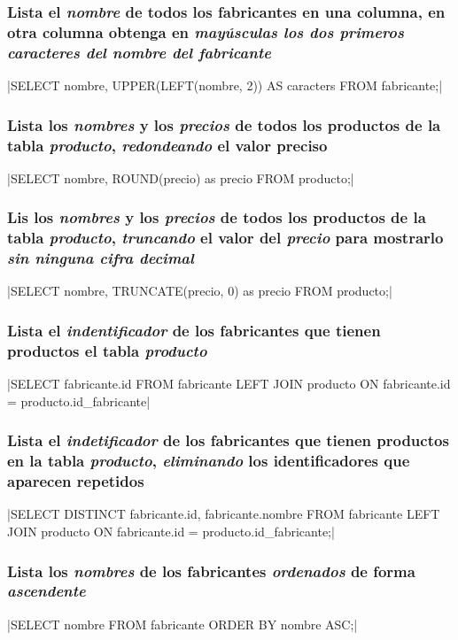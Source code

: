 \documentclass[12pt, letterpaper]{article}
\begin{document}
  \subsubsection{Lista el \textit{\textbf{nombre}} de todos los fabricantes en una columna, en otra columna obtenga en \textit{\textbf{mayúsculas los dos primeros caracteres del nombre del fabricante}}}
   |SELECT nombre, UPPER(LEFT(nombre, 2)) AS caracters FROM fabricante;|

  \subsubsection{Lista los \textit{\textbf{nombres}} y los \textit{\textbf{precios}} de todos los productos de la tabla \textit{\textbf{producto}}, \textit{\textbf{redondeando}} el valor preciso}
   |SELECT nombre, ROUND(precio) as precio FROM producto;|

  \subsubsection{Lis los \textit{\textbf{nombres}} y los \textit{\textbf{precios}} de todos los productos de la tabla \textit{\textbf{producto}}, \textit{\textbf{truncando}} el valor del \textit{\textbf{precio}} para mostrarlo \textit{\textbf{sin ninguna cifra decimal}}}
   |SELECT nombre, TRUNCATE(precio, 0) as precio FROM producto;|

  \subsubsection{Lista el \textit{\textbf{indentificador}} de los fabricantes que tienen productos el tabla \textit{\textbf{producto}}}
   |SELECT fabricante.id FROM fabricante LEFT JOIN producto ON fabricante.id = producto.id_fabricante|
  
  \subsubsection{Lista el \textit{\textbf{indetificador}} de los fabricantes que tienen productos en la tabla \textit{\textbf{producto}}, \textit{\textbf{eliminando}} los identificadores que aparecen repetidos}
   |SELECT DISTINCT fabricante.id, fabricante.nombre FROM fabricante LEFT JOIN producto ON fabricante.id = producto.id_fabricante;|

  \subsubsection{Lista los \textit{\textbf{nombres}} de los fabricantes \textit{\textbf{ordenados}} de forma \textit{\textbf{ascendente}}}
   |SELECT nombre FROM fabricante ORDER BY nombre ASC;|
\end{document}
